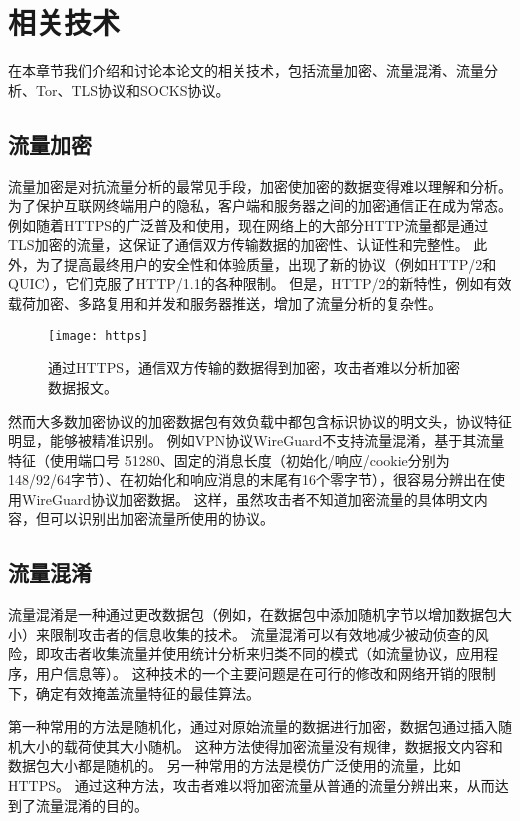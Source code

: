 \chapter{相关技术}
在本章节我们介绍和讨论本论文的相关技术，包括流量加密、流量混淆、流量分析、Tor、TLS协议和SOCKS协议。

\section{流量加密}
流量加密是对抗流量分析的最常见手段，加密使加密的数据变得难以理解和分析。
为了保护互联网终端用户的隐私，客户端和服务器之间的加密通信正在成为常态。
例如随着HTTPS的广泛普及和使用，现在网络上的大部分HTTP流量都是通过TLS加密的流量，这保证了通信双方传输数据的加密性、认证性和完整性。
此外，为了提高最终用户的安全性和体验质量，出现了新的协议（例如HTTP/2和QUIC），它们克服了HTTP/1.1的各种限制。
但是，HTTP/2的新特性，例如有效载荷加密、多路复用和并发和服务器推送，增加了流量分析的复杂性。

\begin{figure}[H]
  \centering
  \texttt{[image: https]}
  \caption{通过HTTPS，通信双方传输的数据得到加密，攻击者难以分析加密数据报文。}
\end{figure}

然而大多数加密协议的加密数据包有效负载中都包含标识协议的明文头，协议特征明显，能够被精准识别。
例如VPN协议WireGuard\cite{donenfeld2017wireguard}不支持流量混淆，基于其流量特征（使用端口号 51280、固定的消息长度（初始化/响应/cookie分别为148/92/64字节）、在初始化和响应消息的末尾有16个零字节），很容易分辨出在使用WireGuard协议加密数据。
这样，虽然攻击者不知道加密流量的具体明文内容，但可以识别出加密流量所使用的协议。


\section{流量混淆}
流量混淆是一种通过更改数据包（例如，在数据包中添加随机字节以增加数据包大小）来限制攻击者的信息收集的技术。
流量混淆可以有效地减少被动侦查的风险，即攻击者收集流量并使用统计分析来归类不同的模式（如流量协议，应用程序，用户信息等）。
这种技术的一个主要问题是在可行的修改和网络开销的限制下，确定有效掩盖流量特征的最佳算法。

第一种常用的方法是随机化，通过对原始流量的数据进行加密，数据包通过插入随机大小的载荷使其大小随机。
这种方法使得加密流量没有规律，数据报文内容和数据包大小都是随机的。
另一种常用的方法是模仿广泛使用的流量，比如HTTPS。
通过这种方法，攻击者难以将加密流量从普通的流量分辨出来，从而达到了流量混淆的目的。

